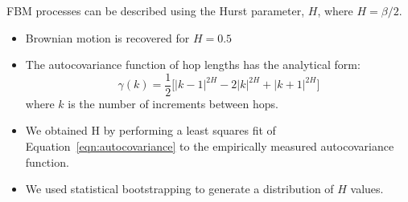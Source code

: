 \documentclass{article}
\begin{document}
  \noindent FBM processes can be described using the Hurst parameter, $H$, where 
  $H = \beta/2$.
  \begin{itemize}
  	\item Brownian motion is recovered for $H = 0.5$
	\item The autocovariance function of hop lengths has the analytical form:~\cite{mandelbrot_fractional_1968}
    \begin{equation}
	\gamma(k) = \dfrac{1}{2}\bigg[|k-1|^{2H} - 2|k|^{2H} + |k+1|^{2H}\bigg]
	\label{eqn:autocovariance}
	\end{equation}
	where $k$ is the number of increments between hops.
	\item We obtained H by performing a least squares fit of Equation~\ref{eqn:autocovariance}
	to the empirically measured autocovariance function.
	\item We used statistical bootstrapping to generate a distribution of $H$ 
	values. %
  \end{itemize}

\end{document}
